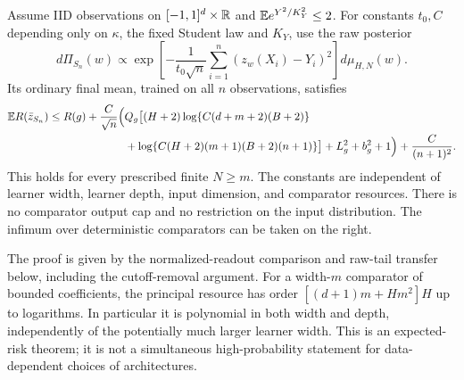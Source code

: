 \begin{theorem}
\label{thm:main-raw-oracle}
Assume IID observations on $[-1,1]^d\times\mathbb R$ and
$\mathbb E e^{Y^2/K_Y^2}\le2$. For constants $t_0,C$ depending only on
$\kappa$, the fixed Student law and $K_Y$, use the raw posterior
\[
 d\Pi_{S_n}(w)\propto
 \exp\left[-\frac1{t_0\sqrt n}
       \sum_{i=1}^n(z_w(X_i)-Y_i)^2\right]d\mu_{H,N}(w).
\]
Its ordinary final mean, trained on all $n$ observations, satisfies
\begin{align*}
 \mathbb E R(\bar z_{S_n})\le R(g)+\frac C{\sqrt n}
 \Big(&Q_g\big[(H+2)\log\{C(d+m+2)(B+2)\}\\
 &+\log\{C(H+2)(m+1)(B+2)(n+1)\}\big]
       +L_g^2+b_g^2+1\Big)+\frac C{(n+1)^2}.
\end{align*}
This holds for every prescribed finite $N\ge m$. The constants are
independent of learner width, learner depth, input dimension, and
comparator resources. There is no comparator output cap and no
restriction on the input distribution. The infimum over deterministic
comparators can be taken on the right.
\end{theorem}
The proof is given by the normalized-readout comparison and raw-tail
transfer below, including the cutoff-removal argument. For a width-$m$
comparator of bounded coefficients, the principal resource has order
$[(d+1)m+Hm^2]H$ up to logarithms. In particular it is polynomial in
both width and depth, independently of the potentially much larger
learner width. This is an expected-risk theorem; it is not a simultaneous
high-probability statement for data-dependent choices of architectures.


